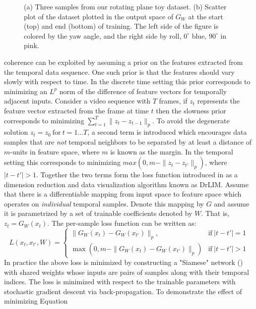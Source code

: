 \begin{figure}
\caption{(a) Three samples from our rotating plane toy dataset. (b) Scatter plot of the dataset plotted in the output space of $G_W$ at the start (top) and end (bottom) of training. The left side of the figure is colored by the yaw angle, and the right side by roll, $0^{\circ}$  blue, $90^{\circ}$ in pink.}  
\end{figure} 

coherence can be exploited by assuming a prior on the features extracted from
the temporal data sequence. One such prior is that the features should vary
slowly with respect to time. In the discrete time setting this prior
corresponds to minimizing an $L^p$ norm of the difference of feature vectors
for temporally adjacent inputs.  Consider a video sequence with $T$ frames, if
$z_t$ represents the feature vector extracted from the frame at time $t$ then
the slowness prior corresponds to minimizing $\sum_{t=1}^{T} \| z_t - z_{t-1}
\|_p$. To avoid the degenerate solution $z_t = z_0 ~\mbox{for}~ t=1...T$, a
second term is introduced which encourages data samples that are \emph{not}
temporal neighbors to be separated by at least a distance of $m$-units in
feature space, where $m$ is known as the margin. In the temporal setting this
corresponds to minimizing $max(0,m-\|z_t - z_{t'}\|_p)$, where $|t-t'| > 1$.
Together the two terms form the loss function introduced in \cite{DrLIM} as a
dimension reduction and data visualization algorithm known as DrLIM.  Assume
that there is a differentiable mapping from input space to feature space which
operates on \emph{individual} temporal samples. Denote this mapping by $G$ and
assume it is parametrized by a set of trainable coefficients denoted by $W$.
That is, $z_t = G_W(x_t)$. The per-sample loss function can be written as:
\begin{equation} \label{eqn:drlimcrit} L(x_t,x_{t'},W)=\left\{
\begin{array}{ll} \|G_W(x_t) - G_W(x_{t'})\|_p, &\text{if}~|t-t'| = 1  \\
\max(0,m-\|G_W(x_t) - G_W(x_{t'})\|_p) &\text{if}~|t-t'| > 1 \end{array}
\right.  \end{equation} In practice the above loss is minimized by constructing
a "Siamese" network (\cite{siamese}) with shared weights whose inputs are pairs
of samples along with their temporal indices. The loss is minimized with
respect to the trainable parameters with stochastic gradient descent via
back-propagation. To demonstrate the effect of minimizing Equation
